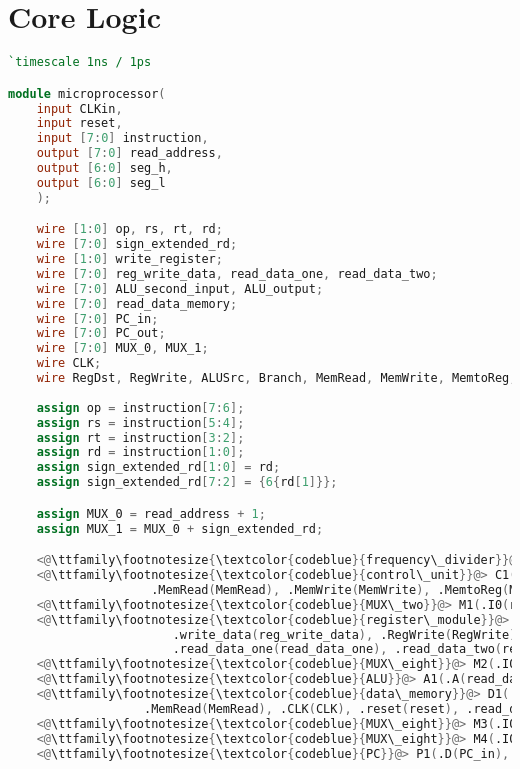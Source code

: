 \documentclass[10pt]{article}
\begin{document}
    \section{Core Logic}
    \begin{lstlisting}[language=Verilog, caption=microprocessor.v]
`timescale 1ns / 1ps

module microprocessor(
	input CLKin,
	input reset,
	input [7:0] instruction,
	output [7:0] read_address,
	output [6:0] seg_h,
	output [6:0] seg_l
	);

	wire [1:0] op, rs, rt, rd;
	wire [7:0] sign_extended_rd;
	wire [1:0] write_register;
	wire [7:0] reg_write_data, read_data_one, read_data_two;
	wire [7:0] ALU_second_input, ALU_output;
	wire [7:0] read_data_memory;
	wire [7:0] PC_in;
	wire [7:0] PC_out;
	wire [7:0] MUX_0, MUX_1;
	wire CLK;
	wire RegDst, RegWrite, ALUSrc, Branch, MemRead, MemWrite, MemtoReg, ALUOp;
	
	assign op = instruction[7:6];
	assign rs = instruction[5:4];
	assign rt = instruction[3:2];
	assign rd = instruction[1:0];
	assign sign_extended_rd[1:0] = rd;
	assign sign_extended_rd[7:2] = {6{rd[1]}};

    assign MUX_0 = read_address + 1;
	assign MUX_1 = MUX_0 + sign_extended_rd;

	<@\ttfamily\footnotesize{\textcolor{codeblue}{frequency\_divider}}@> F1(.clkin(CLKin), .clr(reset), .clkout(CLK));
	<@\ttfamily\footnotesize{\textcolor{codeblue}{control\_unit}}@> C1(.op(op), .RegDst(RegDst), .RegWrite(RegWrite), .ALUSrc(ALUSrc), .Branch(Branch), 
                    .MemRead(MemRead), .MemWrite(MemWrite), .MemtoReg(MemtoReg), .ALUOp(ALUOp));
	<@\ttfamily\footnotesize{\textcolor{codeblue}{MUX\_two}}@> M1(.I0(rt), .I1(rd), .S0(RegDst), .Z(write_register));
	<@\ttfamily\footnotesize{\textcolor{codeblue}{register\_module}}@> R1(.read_register_one(rs), .read_register_two(rt), .write_register(write_register), 
                       .write_data(reg_write_data), .RegWrite(RegWrite), .CLK(CLK), .reset(reset), 
                       .read_data_one(read_data_one), .read_data_two(read_data_two)); 
	<@\ttfamily\footnotesize{\textcolor{codeblue}{MUX\_eight}}@> M2(.I0(read_data_two), .I1(sign_extended_rd), .S0(ALUSrc), .Z(ALU_second_input));
	<@\ttfamily\footnotesize{\textcolor{codeblue}{ALU}}@> A1(.A(read_data_one), .B(ALU_second_input), .ALUOp(ALUOp), .O(ALU_output));
	<@\ttfamily\footnotesize{\textcolor{codeblue}{data\_memory}}@> D1(.address(ALU_output), .write_data(read_data_two), .MemWrite(MemWrite), 
                   .MemRead(MemRead), .CLK(CLK), .reset(reset), .read_data(read_data_memory));
	<@\ttfamily\footnotesize{\textcolor{codeblue}{MUX\_eight}}@> M3(.I0(ALU_output), .I1(read_data_memory), .S0(MemtoReg), .Z(reg_write_data));
	<@\ttfamily\footnotesize{\textcolor{codeblue}{MUX\_eight}}@> M4(.I0(MUX_0), .I1(MUX_1), .S0(Branch), .Z(PC_in));
	<@\ttfamily\footnotesize{\textcolor{codeblue}{PC}}@> P1(.D(PC_in), .CLK(CLK), .reset(reset), .Q(read_address));
	

\end{lstlisting}
\end{document}
